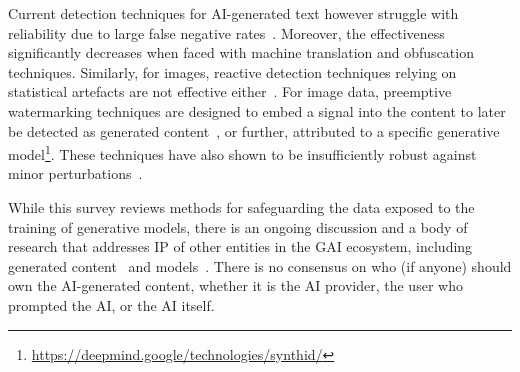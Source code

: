 Current detection techniques for AI-generated text however struggle with reliability due to large false negative rates~\cite{sadasivan_can_2024,weber-wulff_testing_2023}. 
Moreover, the effectiveness significantly decreases when faced with machine translation and obfuscation techniques.
Similarly, for images, reactive detection techniques relying on statistical artefacts are not effective either~\cite{corvi_detection_2023}.
For image data, preemptive watermarking techniques are designed to embed a signal into the content to later be detected as generated content~\cite{zhu_hidden_2018,zhang_udh_2020}, or further, attributed to a specific generative model\footnote{\url{https://deepmind.google/technologies/synthid/}}.%
These techniques have also shown to be insufficiently robust against minor perturbations~\cite{jiang_evading_2023}. 

While this survey reviews methods for safeguarding the data exposed to the training of generative models, there is an ongoing discussion and a body of research that addresses IP of other entities in the GAI ecosystem, including generated content~\cite{chesterman_good_2023} and models~\cite{ong_protecting_2021,peng_are_2023}. 
There is no consensus on who (if anyone) should own the AI-generated content, whether it is the AI provider, the user who prompted the AI, or the AI itself. 

